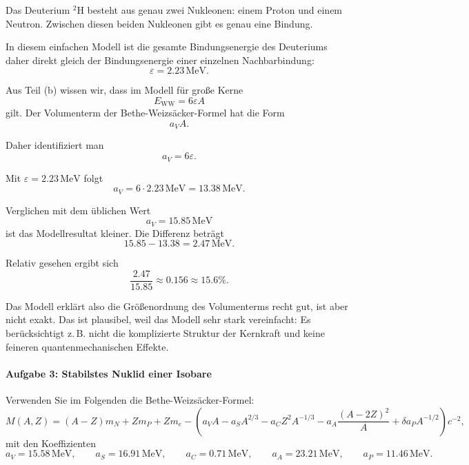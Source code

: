 \documentclass[11pt,a4paper]{scrartcl}
\begin{document}
\begin{enumerate}[label=(\alph*)]
    \begin{solutionbox}
        Das Deuterium ${}^2\mathrm{H}$ besteht aus genau zwei Nukleonen:
        einem Proton und einem Neutron.
        Zwischen diesen beiden Nukleonen gibt es genau eine Bindung.

        In diesem einfachen Modell ist die gesamte Bindungsenergie des Deuteriums daher direkt gleich der Bindungsenergie einer einzelnen Nachbarbindung:
        \[
            \varepsilon = 2.23\,\mathrm{MeV}.
        \]

        Aus Teil (b) wissen wir, dass im Modell für große Kerne
        \[
            E_{\mathrm{WW}}=6\varepsilon A
        \]
        gilt.
        Der Volumenterm der Bethe-Weizsäcker-Formel hat die Form
        \[
            a_VA.
        \]

        Daher identifiziert man
        \[
            a_V=6\varepsilon.
        \]

        Mit $\varepsilon=2.23\,\mathrm{MeV}$ folgt
        \[
            a_V=6\cdot 2.23\,\mathrm{MeV}=13.38\,\mathrm{MeV}.
        \]

        Verglichen mit dem üblichen Wert
        \[
            a_V=15.85\,\mathrm{MeV}
        \]
        ist das Modellresultat kleiner.
        Die Differenz beträgt
        \[
            15.85-13.38=2.47\,\mathrm{MeV}.
        \]

        Relativ gesehen ergibt sich
        \[
            \frac{2.47}{15.85}\approx 0.156 \approx 15.6\%.
        \]

        Das Modell erklärt also die Größenordnung des Volumenterms recht gut, ist aber nicht exakt.
        Das ist plausibel, weil das Modell sehr stark vereinfacht:
        Es berücksichtigt z.\,B. nicht die komplizierte Struktur der Kernkraft und keine feineren quantenmechanischen Effekte.
    \end{solutionbox}

\end{enumerate}

\paragraph{Aufgabe 3: Stabilstes Nuklid einer Isobare}

Verwenden Sie im Folgenden die Bethe-Weizsäcker-Formel:
\[
M(A, Z) = (A - Z)m_N + Zm_P + Zm_e
-
\left(
a_VA - a_SA^{2/3} - a_CZ^2A^{-1/3} - a_A\frac{(A - 2Z)^2}{A} + \delta a_P A^{-1/2}
\right)c^{-2},
\]
mit den Koeffizienten
\[
a_V = 15.58\,\mathrm{MeV}, \qquad
a_S = 16.91\,\mathrm{MeV}, \qquad
a_C = 0.71\,\mathrm{MeV}, \qquad
a_A = 23.21\,\mathrm{MeV}, \qquad
a_P = 11.46\,\mathrm{MeV}.
\]
\end{document}
